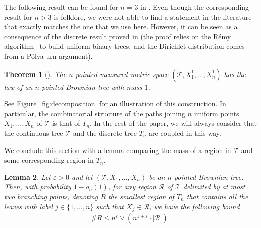 \documentclass[11pt]{article}
\newcommand{\Tt}{\mathcal{T}}
\newcommand{\Rr}{\mathcal{R}}
\let\eps\varepsilon
\theoremstyle{plain}
\newtheorem{theorem}{Theorem}
\newtheorem{lemma}[theorem]{Lemma}
\theoremstyle{definition}
\numberwithin{equation}{section}
\begin{document}
The following result can be found for $n=3$ in \cite{aldous_recursive_1994}.
Even though the corresponding result for $n>3$ is folklore, we were not able to find a statement in the literature that exactly matches the one that we use here. However, it can be seen as a consequence of the discrete result proved in \cite[Ex.\,7.4.12 and Ex.\,7.4.13]{pitman_combinatorial_2006} (the proof relies on the Rémy algorithm~\cite{Rem85} to build uniform binary trees, and the Dirichlet distribution comes from a Pólya urn argument).
\begin{theorem}[\cite{aldous_recursive_1994,pitman_combinatorial_2006}]\label{thm_discrete_continuous_coupling}
The $n$-pointed measured metric space $( \widetilde{\Tt}, X_1^1, \dots, X_n^1)$ has the law of an $n$-pointed Brownian tree with mass $1$.
\end{theorem}
See Figure~\ref{fig:decomposition} for an illustration of this construction.
In particular, the combinatorial structure of the paths joining $n$ uniform points $X_1, \dots, X_n$ of $\Tt$ is that of $T_n$.
In the rest of the paper, we will always consider that the continuous tree $\Tt$ and the discrete tree $T_n$ are coupled in this way.

We conclude this section with a lemma comparing the mass of a region in $\Tt$ and some corresponding region in $T_n$.
\begin{lemma}\label{lem:comparison mass vs leaf-count}
Let $\eps>0$ and let $\left( \Tt, X_1, \dots, X_n \right)$ be an $n$-pointed Brownian tree.
Then, with probability $1 - o_n(1)$, for any region $\Rr$ of $\Tt$ delimited by at most two branching points,
denoting $R$ the smallest region of $T_n$ that contains all the leaves with label $j \in \{1,\dots,n\}$ such that $X_j \in \Rr$, we have the following bound
\begin{align*}
\#R \leq n^\eps \vee (n^{1+\eps} \cdot |\Rr|).
\end{align*}
\end{lemma}
\end{document}
